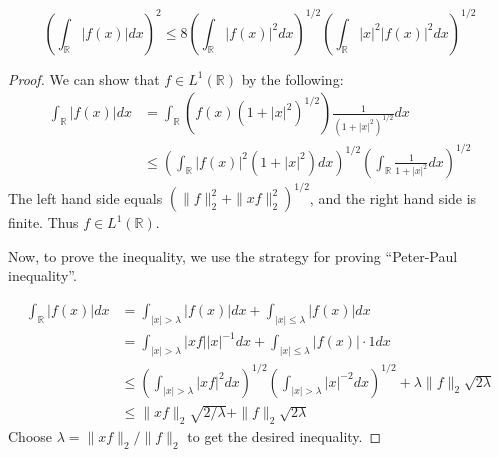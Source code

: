 \begin{enumerate}
\[
\left(\int_{\mathbb{R}}|f(x)| d x\right)^2 \leq 8\left(\int_{\mathbb{R}}|f(x)|^2 d x\right)^{1 / 2}\left(\int_{\mathbb{R}}|x|^2|f(x)|^2 d x\right)^{1 / 2}
\]

\begin{proof}
	We can show that $f \in L^1(\mathbb{R})$ by the following:
	\begin{align*}
		\int_{\mathbb{R}} |f(x)| dx
		&= \int_{\mathbb{R}} (f(x) (1 + |x|^2)^{1 / 2}) \frac{1}{(1 + |x|^2)^{1 / 2}} dx \\
		&\le \left( \int_{\mathbb{R}} |f(x)|^2 (1 + |x|^2) dx \right) ^{1 / 2} \left( \int_{\mathbb{R}} \frac{1}{1 + |x|^2} dx \right) ^{1 / 2}
	\end{align*}
	The left hand side equals $(\| f \|_2^2 + \| x f \|_2^2)^{1 / 2}$, and the right hand side is finite. Thus $f \in L^1(\mathbb{R})$.

	Now, to prove the inequality, we use the strategy for proving ``Peter-Paul inequality''.	

	\begin{align*}
		\int_{\mathbb{R}} |f(x)| dx 
	&=  \int_{|x| > \lambda} |f(x)| dx + \int_{|x| \le \lambda} |f(x)| dx \\	
	&=  \int_{|x| > \lambda} |xf| |x|^{-1} dx + \int_{|x| \le \lambda} |f(x)| \cdot 1 dx \\
	&\le \left( \int_{|x| > \lambda} |x f|^2 dx \right) ^{1 / 2} \left( \int_{|x| > \lambda} |x|^{-2} dx \right) ^{1 / 2} + \lambda \| f \|_2 \sqrt{2 \lambda} \\
	&\le \| x f\| _2 \sqrt{2 / \lambda} + \| f \|_2 \sqrt{2 \lambda} 
	\end{align*}	
	Choose $\lambda = \| x f \|_2 / \| f \|_2$ to get the desired inequality.
\end{proof}


\end{enumerate}
